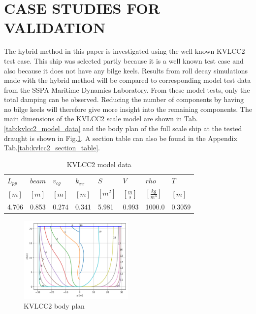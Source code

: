 \section*{CASE STUDIES FOR VALIDATION}\label{case-studies-for-validation}
\label{sec:validation}
The hybrid method in this paper is investigated using the well known
KVLCC2 test case. This ship was selected partly because it is a well
known test case and also because it does not have any bilge keels.
Results from roll decay simulations made with the hybrid method will be
compared to corresponding model test data from the SSPA Maritime
Dynamics Laboratory. From these model tests, only the total damping can
be observed. Reducing the number of components by having no bilge keels
will therefore give more insight into the remaining components. The main
dimensions of the KVLCC2 scale model are shown in
Tab.\ref{tab:kvlcc2_model_data} and the body plan of the full
scale ship at the tested draught is shown in
Fig.\ref{fig:body_plan}. A section table can also be found in
the Appendix Tab.\ref{tab:kvlcc2_section_table}.
\begin{table}[H]
\scriptsize
\center
\caption{KVLCC2 model data}
\label{tab:tab:kvlcc2_model_data}
\begin{tabular}{|l|l|l|l|l|l|l|l|}
\hline\addlinespace
$L_{pp}$ & $beam$ & $v_{cg}$ & $k_{xx}$ & $S$ & $V$ & $rho$ & $T$\\
$[m]$ & $[m]$ & $[m]$ & $[m]$ & $[m^2]$ & $\left[\frac{m}{s}\right]$ & $\left[\frac{kg}{m^3}\right]$ & $[m]$\\
\hline4.706 & 0.853 & 0.274 & 0.341 & 5.981 & 0.993 & 1000.0 & 0.3059\\
\hline
\end{tabular}
\end{table}
\begin{figure}[H]
\begin{center}\includegraphics[width = 0.5\textwidth]{figures/body_plan.png}\end{center}
\vspace{-1cm}
\caption{KVLCC2 body plan}
\label{fig:body_plan}
\end{figure}
